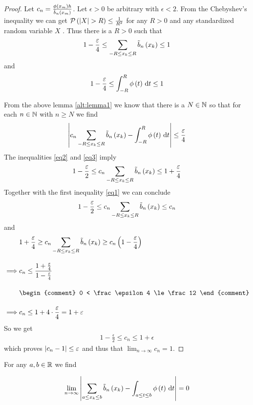 \begin{proof}
  Let $c_n = \frac{\fphi{\xnp}h}{\bnp}$. Let $\epsilon > 0$ be arbitrary with $\epsilon < 2$. From the Chebyshev's inequality we can get $\P{\abs{X}> R} \le \frac{1}{R^2}$ for any $R > 0$ and any standardized random variable $X$ \cite{wiki:chebyshev}. Thus there is a $R >0$ such that
  \begin{align}\label{eq1}
    1 -\frac{\epsilon}4 \le \sum_{-R \le \x \le R} \bb{\x[k]} \le 1
  \end{align}
  and
  \begin{align}\label{eq2}
    1-\frac{\epsilon}4 \le \int_{-R}^R \fphi{t}\d{t} \le 1
  \end{align}

  From the above lemma \ref{alt:lemma1} we know that there is a $N\in\N$ so that for each $n\in\N$ with $n\ge N$ we find
  \begin{align} \label{eq3}
    \abs{c_n \sum_{-R\le\x\le R}\bb{\x} - \int_{-R}^R \fphi{t}\d{t}} \le \frac{\epsilon}4
  \end{align}
  The inequalities \eqref{eq2} and \eqref{eq3} imply
  \begin{align}
    1-\frac{\epsilon}2 \le c_n \sum_{-R \le \x \le R} \bb{\x} \le 1+\frac{\epsilon}4
  \end{align}
  Together with the first inequality \eqref{eq1} we can conclude
  \begin{align}
    1-\frac \epsilon2 \le c_n \sum_{-R \le \x \le R} \bb{\x} \le c_n
  \end{align}
  and
  \begin{align}
    & 1+\frac \epsilon4 \ge c_n \sum_{-R \le \x \le R} \bb{\x} \ge c_n \br{1-\frac \epsilon4} \bnl
    \implies & c_n \le \frac{1+\frac \epsilon4}{1-\frac\epsilon4} \bnl
    &
    \begin{comment}
      0 < \frac \epsilon 4 \le \frac 12
    \end{comment} \bnl
    \implies & c_n \le 1+4\cdot \frac \epsilon 4 = 1+\epsilon
  \end{align}
  So we get
  \begin{align}
    1-\frac \epsilon 2 \le c_n \le 1+\epsilon
  \end{align}
  which proves $\abs{c_n-1} \le \epsilon$ and thus that $\lim_{n\to\infty} c_n = 1$.
\end{proof}

\begin{theorem}
  For any $a,b\in\R$ we find

  \begin{align}
    \lim_{n\to\infty} \abs{\sum_{a \le \x \le b} \bb{\x} - \int_{a \le t \le b} \fphi{t} \d{t} } = 0
  \end{align}
\end{theorem}

